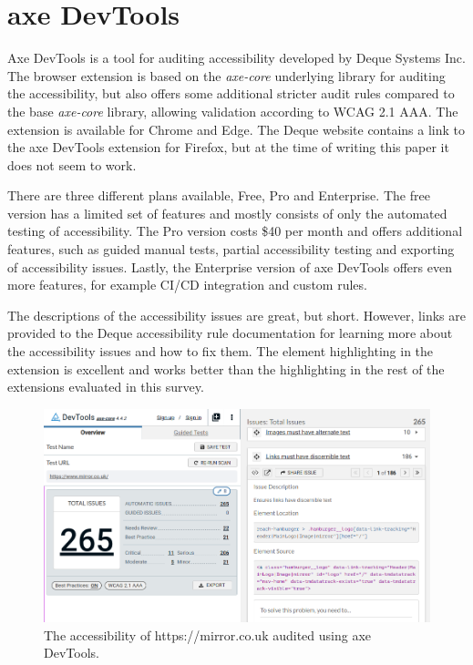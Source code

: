 \section{axe DevTools}
Axe DevTools \parencite{axe_devtools} is a tool for auditing accessibility developed by Deque Systems Inc.
The browser extension is based on the \emph{axe-core} underlying library for auditing the accessibility, but also offers some additional stricter audit rules compared to the base \emph{axe-core} library, allowing validation according to WCAG 2.1 AAA.
The extension is available for Chrome and Edge.
The Deque website contains a link to the axe DevTools extension for Firefox, but at the time of writing this paper it does not seem to work.

There are three different plans available, Free, Pro and Enterprise.
The free version has a limited set of features and mostly consists of only the automated testing of accessibility.
The Pro version costs \$40 per month and offers additional features, such as guided manual tests, partial accessibility testing and exporting of accessibility issues.
Lastly, the Enterprise version of axe DevTools offers even more features, for example CI/CD integration and custom rules.

The descriptions of the accessibility issues are great, but short.
However, links are provided to the Deque accessibility rule documentation for learning more about the accessibility issues and how to fix them.
The element highlighting in the extension is excellent and works better than the highlighting in the rest of the extensions evaluated in this survey.


\begin{figure}[h]
\centering
\includegraphics[keepaspectratio,width=\linewidth,height=\halfh]
{images/axe-devtools-ext.png}

\caption[axe DevTools]{
The accessibility of https://mirror.co.uk audited using axe DevTools.
}
\label{fig:axe-devtools-ext}
\end{figure}

